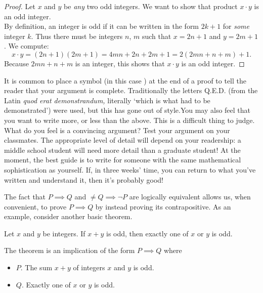 \begin{proof}
Let $x$ and $y$ be \emph{any} two odd integers. We want to show that product $x\cdot y$ is an odd integer. \\
By definition, an integer is odd if it can be written in the form $2k+1$ for \emph{some} integer $k$. Thus there must be integers $n$, $m$ such that $x=2n+1$ and $y=2m+1$. We compute:
\[x\cdot y=(2n+1)(2m+1)=4mn+2n+2m+1=2(2mn+n+m)+1.\]
Because $2mn+n+m$ is an integer, this shows that $x\cdot y$ is an odd integer.
\end{proof}

 It is common to place a symbol (in this case \smash{\raisebox{7pt}{$\qedsymbol$}}) at the end of a proof to tell the reader that your argument is complete. Traditionally the letters Q.E.D. (from the Latin \emph{quod erat demonstrandum,} literally `which is what had to be demonstrated') were used, but this has gone out of style.You may also feel that you want to write more, or less than the above. This is a difficult thing to judge. What do you feel is a convincing argument? Test your argument on your classmates. The appropriate level of detail will depend on your readership: a middle school student will need more detail than a graduate student! At the moment, the best guide is to write for someone with the same mathematical sophistication as yourself. If, in three weeks' time, you can return to what you've written and understand it, then it's probably good!






The fact that $P\implies Q$ and $\neq Q\implies\neg P$ are logically equivalent allows us, when convenient, to prove $P\implies Q$ by instead proving its contrapositive. As an example, consider another basic theorem.

\begin{thm}{}{}
Let $x$ and $y$ be integers. If $x+y$ is odd, then exactly one of $x$ or $y$ is odd.
\end{thm}

 The theorem is an implication of the form $P\implies Q$ where
\begin{itemize}\setlength{\itemsep}{0pt}
  \item[]$P$. The sum $x+y$ of integers $x$ and $y$ is odd.
  \item[]$Q$. Exactly one of $x$ or $y$ is odd.
\end{itemize}


